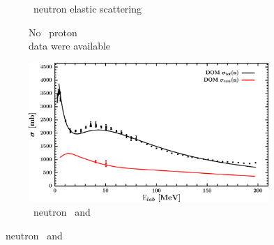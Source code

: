 \begin{figure}[hbtp]
\begin{subfigure}[c]{0.39\textheight}
        \caption{\caForty\ neutron elastic scattering}
        \label{DOMFitData_ca40_neutron_elastic}
    \end{subfigure}\vspace{0.70in}
    \begin{subfigure}[c]{0.45\textwidth}
        \centering
        \caption{No \caForty\ proton \rxn\\ data were available}
        \label{DOMFitData_ca40_proton_inelastic}
    \end{subfigure}\hspace{6pt}
    \begin{subfigure}[c]{0.45\textwidth}
        \centering
        \includegraphics[width=\linewidth]{figures/ca40_neutronInelastic.png}
        \caption{\caForty\ neutron \rxn\ and \tot}
        \label{DOMFitData_ca40_neutron_inelastic}
    \end{subfigure}
\end{figure}
\afterpage{\clearpage}

